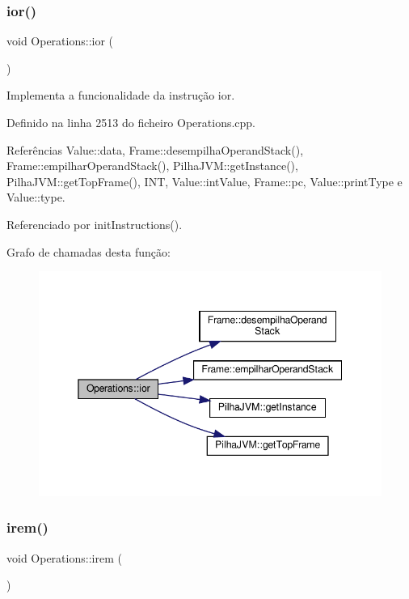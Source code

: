 \subsubsection{\texorpdfstring{ior()}{ior()}}
{\footnotesize\ttfamily void Operations\+::ior (\begin{DoxyParamCaption}{ }\end{DoxyParamCaption})\hspace{0.3cm}{\ttfamily [private]}}



Implementa a funcionalidade da instrução ior. 



Definido na linha 2513 do ficheiro Operations.\+cpp.



Referências Value\+::data, Frame\+::desempilha\+Operand\+Stack(), Frame\+::empilhar\+Operand\+Stack(), Pilha\+J\+V\+M\+::get\+Instance(), Pilha\+J\+V\+M\+::get\+Top\+Frame(), I\+NT, Value\+::int\+Value, Frame\+::pc, Value\+::print\+Type e Value\+::type.



Referenciado por init\+Instructions().

Grafo de chamadas desta função\+:
\nopagebreak
\begin{figure}[H]
\begin{center}
\leavevmode
\includegraphics[width=345pt]{classOperations_aaa890c310bc7a93e97b2c5004df94e70_cgraph}
\end{center}
\end{figure}
\mbox{\label{classOperations_a510bd2d155695861597a4413b44565bc}} 
\subsubsection{\texorpdfstring{irem()}{irem()}}
{\footnotesize\ttfamily void Operations\+::irem (\begin{DoxyParamCaption}{ }\end{DoxyParamCaption})\hspace{0.3cm}{\ttfamily [private]}}



